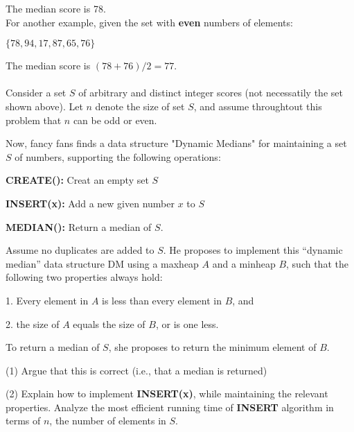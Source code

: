 \documentclass[10.5pt]{article}
\begin{document}
The median score is 78.\\

For another example, given the set with \textbf{even} numbers of elements:

\begin{center}
$\{78,94,17,87,65,76\}$
\end{center}

The median score is $(78+76)/2=77$.
\paragraph{}

Consider a set $S$ of arbitrary and distinct integer scores (not necessatily the set shown above). Let $n$ denote the size of set $S$, and assume throughtout this problem that $n$ can be odd or even.

Now, fancy fans finds a data structure "Dynamic Medians" for maintaining a set $S$ of numbers, supporting the following operations:

\textbf{CREATE():} Creat an empty set $S$

\textbf{INSERT(x):} Add a new given number $x$ to $S$

\textbf{MEDIAN():} Return a median of $S$.

Assume no duplicates are added to $S$. He proposes to implement this “dynamic median” data structure DM using a maxheap
$A$ and a minheap $B$, such that the following two properties always hold:

1. Every element in $A$ is less than every element in $B$, and

2. the size of $A$ equals the size of $B$, or is one less.

To return a median of $S$, she proposes to return the minimum element of $B$.

\newpage
(1) Argue that this is correct (i.e., that a median is returned)


\newpage
(2) Explain how to implement \textbf{INSERT(x)}, while maintaining the relevant properties.
Analyze the most efficient running time of \textbf{INSERT} algorithm in terms of $n$, the number
of elements in $S$.
\end{document}
